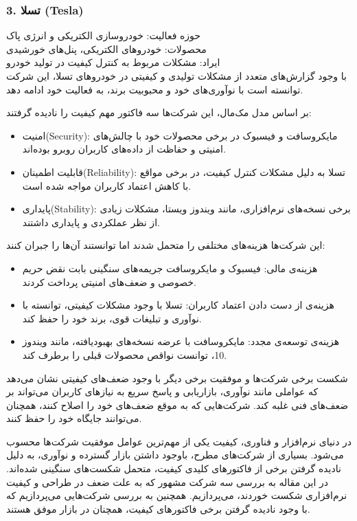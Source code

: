 \subsubsection*{3. تسلا (Tesla)}
{حوزه فعالیت:} خودروسازی الکتریکی و انرژی پاک\\
{محصولات:} خودروهای الکتریکی، پنل‌های خورشیدی\\
{ایراد:} مشکلات مربوط به کنترل کیفیت در تولید خودرو\\
با وجود گزارش‌های متعدد از مشکلات تولیدی و کیفیتی در خودروهای تسلا، این شرکت توانسته است با نوآوری‌های خود و محبوبیت برند، به فعالیت خود ادامه دهد.

بر اساس مدل مک‌مال، این شرکت‌ها سه فاکتور مهم کیفیت را نادیده گرفتند:
\begin{itemize}
    \item {امنیت(Security):} مایکروسافت و فیسبوک در برخی محصولات خود با چالش‌های امنیتی و حفاظت از داده‌های کاربران روبرو بوده‌اند.
    \item {قابلیت اطمینان(Reliability):} تسلا به دلیل مشکلات کنترل کیفیت، در برخی مواقع با کاهش اعتماد کاربران مواجه شده است.
    \item {پایداری(Stability):} برخی نسخه‌های نرم‌افزاری، مانند ویندوز ویستا، مشکلات زیادی از نظر عملکردی و پایداری داشتند.
\end{itemize}

این شرکت‌ها هزینه‌های مختلفی را متحمل شدند اما توانستند آن‌ها را جبران کنند:
\begin{itemize}
    \item {هزینه‌ی مالی:} فیسبوک و مایکروسافت جریمه‌های سنگینی بابت نقض حریم خصوصی و ضعف‌های امنیتی پرداخت کردند.
    \item {هزینه‌ی از دست دادن اعتماد کاربران:} تسلا با وجود مشکلات کیفیتی، توانسته با نوآوری و تبلیغات قوی، برند خود را حفظ کند.
    \item {هزینه‌ی توسعه‌ی مجدد:} مایکروسافت با عرضه نسخه‌های بهبودیافته، مانند ویندوز 10، توانست نواقص محصولات قبلی را برطرف کند.
\end{itemize}

شکست برخی شرکت‌ها و موفقیت برخی دیگر با وجود ضعف‌های کیفیتی نشان می‌دهد که عواملی مانند نوآوری، بازاریابی و پاسخ سریع به نیازهای کاربران می‌تواند بر ضعف‌های فنی غلبه کند. شرکت‌هایی که به موقع ضعف‌های خود را اصلاح کنند، همچنان می‌توانند جایگاه خود را حفظ کنند.




در دنیای نرم‌افزار و فناوری، کیفیت یکی از مهم‌ترین عوامل موفقیت شرکت‌ها محسوب می‌شود. بسیاری از شرکت‌های مطرح، باوجود داشتن بازار گسترده و نوآوری، به دلیل نادیده گرفتن برخی از فاکتورهای کلیدی کیفیت، متحمل شکست‌های سنگینی شده‌اند. در این مقاله به بررسی سه شرکت مشهور که به علت ضعف در طراحی و کیفیت نرم‌افزاری شکست خوردند، می‌پردازیم. همچنین به بررسی شرکت‌هایی می‌پردازیم که با وجود نادیده گرفتن برخی فاکتورهای کیفیت، همچنان در بازار موفق هستند.

